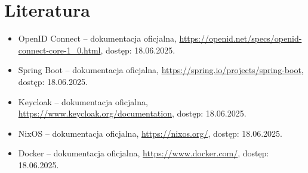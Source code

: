\documentclass[../../spr.tex]{subfiles}
\begin{document}
\section{Literatura}
    \begin{itemize}
        \item OpenID Connect – dokumentacja oficjalna, \url{https://openid.net/specs/openid-connect-core-1_0.html}, dostęp: 18.06.2025.
        \item Spring Boot – dokumentacja oficjalna, \url{https://spring.io/projects/spring-boot}, dostęp: 18.06.2025.
        \item Keycloak – dokumentacja oficjalna, \url{https://www.keycloak.org/documentation}, dostęp: 18.06.2025.
        \item NixOS – dokumentacja oficjalna, \url{https://nixos.org/}, dostęp: 18.06.2025.
        \item Docker – dokumentacja oficjalna, \url{https://www.docker.com/}, dostęp: 18.06.2025.
    \end{itemize}
\end{document}
